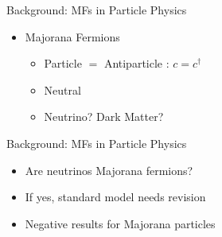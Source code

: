 \documentclass[xcolor=dvipsnames,10pt,aspectratio=169]{beamer}
\newcommand{\BD}{Background}
\begin{document}
\begin{frame}{\BD: MFs in Particle Physics}
\begin{multicols}{2}
      \begin{itemize}
        \setlength\itemsep{0pt}
        \small
        \item Majorana Fermions
        \begin{itemize}
            \item Particle $=$ Antiparticle : $c = c^{\dagger}$
            \item Neutral
            \item Neutrino? Dark Matter?
        \end{itemize}
      \end{itemize}

    \end{multicols}

  \end{frame}

  \begin{frame}{\BD: MFs in Particle Physics}
    \begin{multicols}{2}
      \centering

      \begin{itemize}
          \item Are neutrinos Majorana fermions?
          \item If yes, standard model needs revision
          \item Negative results for Majorana particles
      \end{itemize}

    \end{multicols}
  \end{frame}
\end{document}
